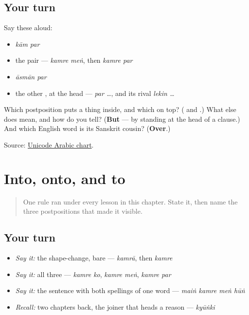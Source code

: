 \subsection*{Your turn}
Say these aloud:

\begin{itemize}
\raggedright
  \item \emph{kām par}
  \item the pair — \emph{kamre meṅ}, then \emph{kamre par}
  \item \emph{āsmān par}
  \item the other , at the head — \emph{par …}, and its rival \emph{lekin …}
\end{itemize}

\begin{tcolorbox}[breakable,colback=teal!4,colframe=teal!35!black,title={Before you move on}]
Which postposition puts a thing inside, and which on top? (\textbf{} and \textbf{}.) What else does \textbf{} mean, and how do you tell? (\textbf{But} — by standing at the head of a clause.) And which English word is its Sanskrit cousin? (\textbf{Over}.)

Source: \href{https://www.unicode.org/charts/PDF/U0600.pdf}{Unicode Arabic chart}.
\end{tcolorbox}
\section[\texorpdfstring{\ur{کمرے} · \ur{کو} · \ur{میں} … (kamre · ko · meṅ …)}{کمرے · کو · میں … (kamre · ko · meṅ …)}]{Into, onto, and to}

\label{lesson:UR-R23-into-and-onto}



\begin{quote}
One rule ran under every lesson in this chapter. State it, then name the three postpositions that made it visible.
\end{quote}

\subsection*{Your turn}
\begin{itemize}
\raggedright
  \item \emph{Say it:} the shape-change, bare — \emph{kamrā}, then \emph{kamre}
  \item \emph{Say it:} all three — \emph{kamre ko}, \emph{kamre meṅ}, \emph{kamre par}
  \item \emph{Say it:} the sentence with both spellings of one word — \emph{maiṅ kamre meṅ hūṅ}
  \item \emph{Recall:} two chapters back, the joiner that heads a reason — \emph{kyūṅki}
\end{itemize}

